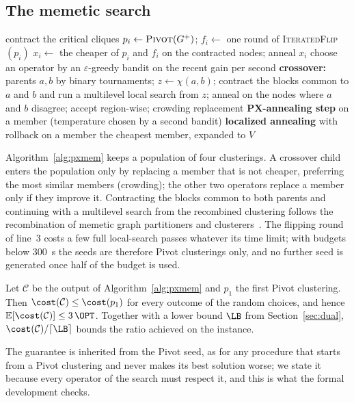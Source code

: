 \subsection{The memetic search}

\begin{algorithm}[t]
\caption{PXMem$(G^+,T)$}\label{alg:pxmem}
\begin{algorithmic}[1]
\State contract the critical cliques
  \State $p_i\gets\textsc{Pivot}(G^+)$; $f_i\gets$ one round of \textsc{IteratedFlip}$(p_i)$
  \State $x_i\gets$ the cheaper of $p_i$ and $f_i$ on the contracted nodes; anneal $x_i$
\EndFor
{}
  \State choose an operator by an $\varepsilon$-greedy bandit on the recent gain per second
  \State \textbf{crossover:} parents $a,b$ by binary tournaments; $z\gets\chi(a,b)$;
  \Statex \hspace{\algorithmicindent} contract the blocks common to $a$ and $b$ and run a multilevel local search from $z$;
  \Statex \hspace{\algorithmicindent} anneal on the nodes where $a$ and $b$ disagree; accept region-wise; crowding replacement
  \State \textbf{PX-annealing step} on a member (temperature chosen by a second bandit)
  \State \textbf{localized annealing} with rollback on a member
\EndWhile
\State \Return the cheapest member, expanded to $V$
\end{algorithmic}
\end{algorithm}

Algorithm~\ref{alg:pxmem} keeps a population of four clusterings.  A crossover
child enters the population only by replacing a member that is not cheaper,
preferring the most similar members (crowding); the other two operators
replace a member only if they improve it.  Contracting the blocks common to
both parents and continuing with a multilevel search from the recombined
clustering follows the recombination of memetic graph partitioners and
clusterers~\citep{SandersS12kaffpae,BiedermannHSS18memetic,hausberger2025scc}.  The flipping round of line~3 costs a few
full local-search passes whatever its time limit; with budgets below
\SI{300}{s} the seeds are therefore Pivot clusterings only, and no further seed
is generated once half of the budget is used.

\begin{theorem}\label{thm:pxmem}
Let $\mathcal C$ be the output of Algorithm~\ref{alg:pxmem} and $p_1$ the first
Pivot clustering.  Then $\cost(\mathcal C)\le\cost(p_1)$ for every outcome of
the random choices, and hence $\mathbb E[\cost(\mathcal C)]\le3\,\OPT$.  Together
with a lower bound $\LB$ from Section~\ref{sec:dual},
$\cost(\mathcal C)/\lceil\LB\rceil$ bounds the ratio achieved on the instance.
\end{theorem}
The guarantee is inherited from the Pivot seed, as for any procedure that
starts from a Pivot clustering and never makes its best solution worse; we state
it because every operator of the search must respect it, and this is what the
formal development checks.

